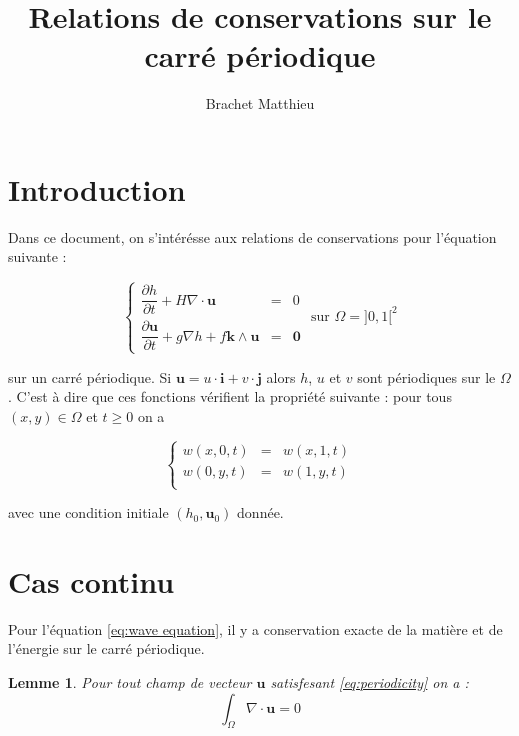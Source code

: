 \documentclass[10pt,a4paper]{article}
\author{Brachet Matthieu}
\title{Relations de conservations sur le carré périodique}
\newtheorem{lemme}{Lemme}
\def\gint{\displaystyle\int}
\begin{document}
\maketitle

\section*{Introduction}
Dans ce document, on s'intérésse aux relations de conservations pour l'équation suivante :

\begin{equation}
\left\lbrace
\begin{array}{rcl}
\dfrac{\partial h}{\partial t} + H \nabla \cdot \mathbf{u} & = & 0 \\
\dfrac{\partial \mathbf{u}}{\partial t} + g \nabla h + f  \mathbf{k} \wedge \mathbf{u} & = & \mathbf{0} 
\end{array}
\right. \text{ sur } \Omega = ]0,1[^2
\label{eq:wave equation}
\end{equation}

sur un carré périodique.
Si $\mathbf{u} = u \cdot \mathbf{i} + v \cdot \mathbf{j}$ alors $h$, $u$ et $v$ sont périodiques sur le $\Omega$.
C'est à dire que ces fonctions vérifient la propriété suivante : pour tous $(x,y) \in \Omega$ et $t\geq0$ on a

\begin{equation}
\left\lbrace
\begin{array}{rcl}
w(x,0,t) & = & w(x,1,t) \\
w(0,y,t) & = & w(1,y,t) \\
\end{array}
\right. 
\label{eq:periodicity}
\end{equation}

avec une condition initiale $(h_0, \mathbf{u}_0)$ donnée.

\section{Cas continu}

Pour l'équation \eqref{eq:wave equation}, il y a conservation exacte de la matière et de l'énergie sur le carré périodique.

\begin{lemme}
Pour tout champ de vecteur $\mathbf{u}$ satisfesant \eqref{eq:periodicity} on a :
\begin{equation}
\gint_{\Omega} \nabla \cdot \mathbf{u} = 0
\end{equation}
\label{lem:div nulle}
\end{lemme}
\end{document}

